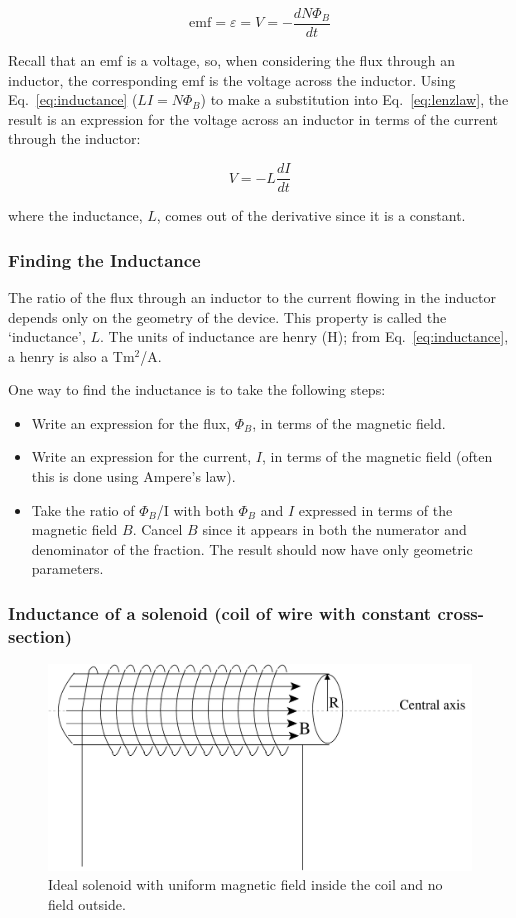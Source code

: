 \documentclass[12pt]{article}
\begin{document}
\begin{flushleft}
\begin{equation}
\mbox{emf} = \varepsilon = V = -\frac{dN\Phi_{B}}{dt}
\label{eq:lenzlaw}
\end{equation}

Recall that an emf is a voltage, so, when considering the flux through an inductor, the corresponding emf is the voltage across the inductor.  Using Eq.~\ref{eq:inductance} ($LI=N\Phi_{B}$) to make a substitution into Eq.~\ref{eq:lenzlaw}, the result is an expression for the voltage across an inductor in terms of the current through the inductor:

\[
V=-L\frac{dI}{dt}
\]

where the inductance, $L$, comes out of the derivative since it is a constant.

\subsubsection*{\bf Finding the Inductance}

The ratio of the flux through an inductor to the current flowing in the inductor depends only on the geometry of the device.  This property is called the `inductance', $L$.  The units of inductance are henry (H); from Eq.~\ref{eq:inductance}, a henry is also a Tm$^{2}$/A.

One way to find the inductance is to take the following steps:

\begin{itemize}
\item Write an expression for the flux, $\Phi_{B}$, in terms of the magnetic field.
\item Write an expression for the current, $I$, in terms of the magnetic field (often this is done using Ampere's law).
\item Take the ratio of $\Phi_{B}$/I with both $\Phi_{B}$ and $I$ expressed in terms of the magnetic field $B$.  Cancel $B$ since it appears in both the numerator and denominator of the fraction.  The result should now have only geometric parameters.
\end{itemize}

\subsubsection*{\bf Inductance of a solenoid (coil of wire with constant cross-section)}

\begin{figure}[h]
\centering
\includegraphics*[trim=0cm 4cm 0cm 0cm, clip=true, width=0.4\columnwidth]{solwB.pdf}
\caption{\small Ideal solenoid with uniform magnetic field inside the coil and no field outside.}
\label{fig:solenoid}
\end{figure}


\end{flushleft}
\end{document}
